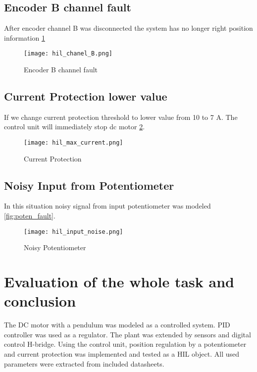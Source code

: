 \newpage
\subsection{Encoder B channel fault}
After encoder channel B was disconnected the system has no longer right
position information \ref{fig:encoder_B}
\begin{figure}[h!]
    \centering
    \texttt{[image: hil\_chanel\_B.png]}
    \caption{Encoder B channel fault}
    \label{fig:encoder_B}
\end{figure}

\subsection{Current Protection lower value}
If we change current protection threshold to lower value from 10 to  7 A. The
control unit will immediately stop dc motor \ref{fig:current}.
\begin{figure}[h!]
    \centering
    \texttt{[image: hil\_max\_current.png]}
    \caption{Current Protection}
    \label{fig:current}
\end{figure}



\subsection{Noisy Input from Potentiometer}
In this situation noisy signal from input potentiometer was modeled
\ref{fig:poten_fault}.
\begin{figure}[h!]
    \centering
    \texttt{[image: hil\_input\_noise.png]}
    \caption{Noisy Potentiometer}
    \label{fig:potent_fault}
\end{figure}



\section{Evaluation of the whole task and conclusion}
The DC motor with a pendulum was modeled as a controlled system. PID
controller was used as a regulator. The plant was extended by sensors and
digital control H-bridge. Using the control unit, position regulation by a
potentiometer and current protection was implemented and tested as a HIL
object. All used parameters were extracted from included datasheets.


